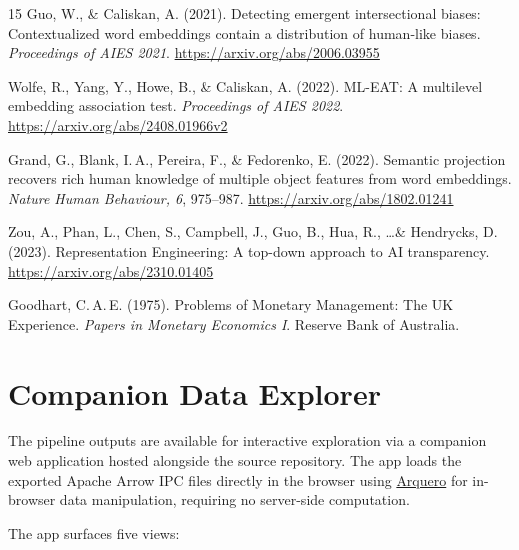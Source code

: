 \documentclass[11pt, letterpaper]{article}
\begin{document}
\begin{thebibliography}{15}
  Guo, W., \& Caliskan, A. (2021). Detecting emergent intersectional biases: Contextualized word embeddings contain a distribution of human-like biases. \textit{Proceedings of AIES 2021}. \url{https://arxiv.org/abs/2006.03955}

  Wolfe, R., Yang, Y., Howe, B., \& Caliskan, A. (2022). ML-EAT: A multilevel embedding association test. \textit{Proceedings of AIES 2022}. \url{https://arxiv.org/abs/2408.01966v2}

  Grand, G., Blank, I.\,A., Pereira, F., \& Fedorenko, E. (2022). Semantic projection recovers rich human knowledge of multiple object features from word embeddings. \textit{Nature Human Behaviour, 6}, 975--987. \url{https://arxiv.org/abs/1802.01241}

  Zou, A., Phan, L., Chen, S., Campbell, J., Guo, B., Hua, R., \dots \& Hendrycks, D. (2023). Representation Engineering: A top-down approach to AI transparency. \url{https://arxiv.org/abs/2310.01405}

  Goodhart, C.\,A.\,E. (1975). Problems of Monetary Management: The UK Experience. \textit{Papers in Monetary Economics I}. Reserve Bank of Australia.

\end{thebibliography}

\newpage

\appendix

\section{Companion Data Explorer}
\label{app:explorer}

The pipeline outputs are available for interactive exploration via a companion web application hosted alongside the source repository. The app loads the exported Apache Arrow IPC files directly in the browser using \href{https://github.com/uwdata/arquero}{Arquero} for in-browser data manipulation, requiring no server-side computation.

The app surfaces five views:
\end{document}

